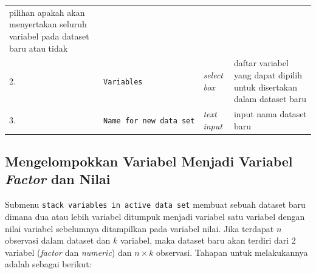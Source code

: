 \documentclass[12pt,]{krantz}
\begin{document}
\begin{longtable}[]{@{}llll@{}}
\begin{minipage}[t]{0.61\columnwidth}
pilihan apakah akan menyertakan seluruh variabel pada dataset baru atau tidak\strut
\end{minipage}\tabularnewline
\begin{minipage}[t]{0.04\columnwidth}\raggedright
2.\strut
\end{minipage} & \begin{minipage}[t]{0.14\columnwidth}\raggedright
\texttt{Variables}\strut
\end{minipage} & \begin{minipage}[t]{0.09\columnwidth}\raggedright
\emph{select box}\strut
\end{minipage} & \begin{minipage}[t]{0.61\columnwidth}\raggedright
daftar variabel yang dapat dipilih untuk disertakan dalam dataset baru\strut
\end{minipage}\tabularnewline
\begin{minipage}[t]{0.04\columnwidth}\raggedright
3.\strut
\end{minipage} & \begin{minipage}[t]{0.14\columnwidth}\raggedright
\texttt{Name\ for\ new\ data\ set}\strut
\end{minipage} & \begin{minipage}[t]{0.09\columnwidth}\raggedright
\emph{text input}\strut
\end{minipage} & \begin{minipage}[t]{0.61\columnwidth}\raggedright
input nama dataset baru\strut
\end{minipage}\tabularnewline
\bottomrule
\end{longtable}

\hypertarget{mengelompokkan-variabel-menjadi-variabel-factor-dan-nilai}{%
\subsection{\texorpdfstring{Mengelompokkan Variabel Menjadi Variabel \emph{Factor} dan Nilai}{Mengelompokkan Variabel Menjadi Variabel Factor dan Nilai}}\label{mengelompokkan-variabel-menjadi-variabel-factor-dan-nilai}}

Submenu \texttt{stack\ variables\ in\ active\ data\ set} membuat sebuah dataset baru dimana dua atau lebih variabel ditumpuk menjadi variabel satu variabel dengan nilai variabel sebelumnya ditampilkan pada variabel nilai. Jika terdapat \(n\) observasi dalam dataset dan \(k\) variabel, maka dataset baru akan terdiri dari 2 variabel (\emph{factor} dan \emph{numeric}) dan \(n\times k\) observasi. Tahapan untuk melakukannya adalah sebagai berikut:
\end{document}
